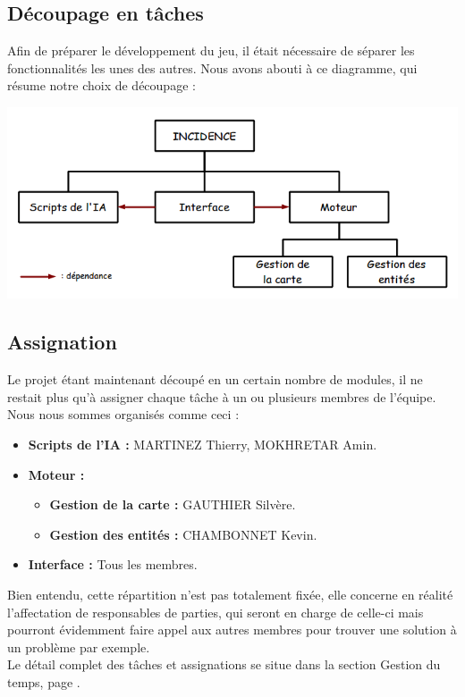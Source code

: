 \documentclass[a4paper]{article}
\newcommand{\alinea}{\hspace*{0.5cm}}
\begin{document}
      \subsection{Découpage en tâches}
        \alinea Afin de préparer le développement du jeu, il était nécessaire de séparer les fonctionnalités les unes des autres. Nous avons abouti à ce diagramme, qui résume notre choix de découpage :
        \begin{center}
          \includegraphics[scale=0.5]{DiagrammeDecoupageProjet.png}
        \end{center}

      \subsection{Assignation}
        \alinea Le projet étant maintenant découpé en un certain nombre de modules, il ne restait plus qu'à assigner chaque tâche à un ou plusieurs membres de l'équipe. Nous nous sommes organisés comme ceci :
        \begin{itemize}
          \item \textbf{Scripts de l'IA :} MARTINEZ Thierry, MOKHRETAR Amin.
          \item \textbf{Moteur :}
          \begin{itemize}
            \item \textbf{Gestion de la carte :} GAUTHIER Silvère.
            \item \textbf{Gestion des entités :} CHAMBONNET Kevin.
          \end{itemize}
          \item \textbf{Interface :} Tous les membres.
        \end{itemize}
        \alinea Bien entendu, cette répartition n'est pas totalement fixée, elle concerne en réalité l'affectation de responsables de parties, qui seront en charge de celle-ci mais pourront évidemment faire appel aux autres membres pour trouver une solution à un problème par exemple.\\
        \alinea Le détail complet des tâches et assignations se situe dans la section Gestion du temps, page \pageref{GestionTps}.
\end{document}
